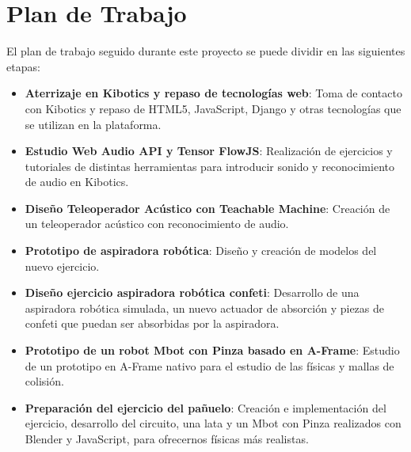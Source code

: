 \section{Plan de Trabajo}
El plan de trabajo seguido durante este proyecto se puede dividir en las siguientes etapas:

\begin{itemize}
    \item \textbf{Aterrizaje en Kibotics y repaso de tecnologías web}: Toma de contacto con Kibotics y repaso de HTML5, JavaScript, Django y otras tecnologías que se utilizan en la plataforma.
    
    \item \textbf{Estudio Web Audio API y Tensor FlowJS}: Realización de ejercicios y tutoriales de distintas herramientas para introducir sonido y reconocimiento de audio en Kibotics.
   
    \item \textbf{Diseño Teleoperador Acústico con Teachable Machine}: Creación de un teleoperador acústico con reconocimiento de audio. 

    \item \textbf{Prototipo de aspiradora robótica}: Diseño y creación de modelos del nuevo ejercicio.
    \item \textbf{Diseño ejercicio aspiradora robótica confeti}: Desarrollo de una aspiradora robótica simulada, un nuevo actuador de absorción y piezas de confeti que puedan ser absorbidas por la aspiradora.
    
    \item \textbf{Prototipo de un robot Mbot con Pinza basado en A-Frame}: Estudio de un prototipo en A-Frame nativo para el estudio de las físicas y mallas de colisión. 
    
    \item \textbf{Preparación del ejercicio del pañuelo}: Creación e implementación del ejercicio, desarrollo del circuito, una lata y un Mbot con Pinza realizados con Blender y JavaScript, para ofrecernos físicas más realistas.

\end{itemize}

